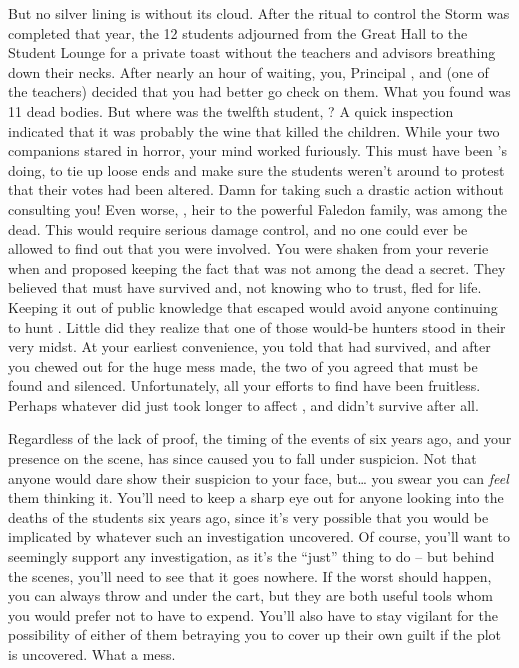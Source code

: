 \documentclass[char]{GL2020}
\begin{document}
But no silver lining is without its cloud. After the ritual to control the Storm was completed that year, the 12 students adjourned from the Great Hall to the Student Lounge for a private toast without the teachers and advisors breathing down their necks. After nearly an hour of waiting, you, Principal \cPrincipal{\full}, and \cMusic{\full} (one of the teachers) decided that you had better go check on them. What you found was 11 dead bodies. But where was the twelfth student, \cKidScientist{\full}? A quick inspection indicated that it was probably the wine that killed the children. While your two companions stared in horror, your mind worked furiously. This must have been \cEvil{}'s doing, to tie up loose ends and make sure the students weren't around to protest that their votes had been altered. Damn \cEvil{\them} for taking such a drastic action without consulting you! Even worse, \cHeirSibling{\full}, heir to the powerful Faledon family, was among the dead. This would require serious damage control, and no one could ever be allowed to find out that you were involved. You were shaken from your reverie when \cPrincipal{} and \cMusic{} proposed keeping the fact that \cKidScientist{} was not among the dead a secret. They believed that \cKidScientist{} must have survived and, not knowing who to trust, fled for \cKidScientist{\their} life. Keeping it out of public knowledge that \cKidScientist{\they} escaped would avoid anyone continuing to hunt \cKidScientist{\them}. Little did they realize that one of those would-be hunters stood in their very midst. At your earliest convenience, you told \cEvil{} that \cKidScientist{} had survived, and after you chewed \cEvil{\them} out for the huge mess \cEvil{\they} made, the two of you agreed that \cKidScientist{\they} must be found and silenced. Unfortunately, all your efforts to find \cKidScientist{\them} have been fruitless. Perhaps whatever \cEvil{} did just took longer to affect \cKidScientist{}, and \cKidScientist{\they} didn't survive after all.

Regardless of the lack of proof, the timing of the events of six years ago, and your presence on the scene, has since caused you to fall under suspicion. Not that anyone would dare show their suspicion to your face, but\ldots{} you swear you can \emph{feel} them thinking it. You'll need to keep a sharp eye out for anyone looking into the deaths of the students six years ago, since it's very possible that you would be implicated by whatever such an investigation uncovered. Of course, you'll want to seemingly support any investigation, as it's the ``just'' thing to do -- but behind the scenes, you'll need to see that it goes nowhere. If the worst should happen, you can always throw \cEvil{} and \cHeadScientist{} under the cart, but they are both useful tools whom you would prefer not to have to expend. You'll also have to stay vigilant for the possibility of either of them betraying you to cover up their own guilt if the plot is uncovered. What a mess.
\end{document}
